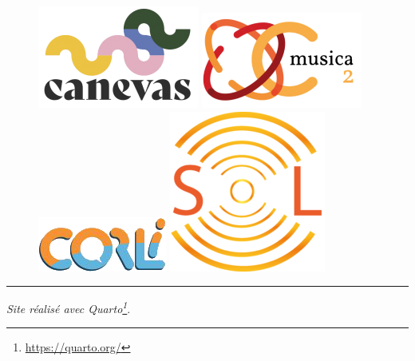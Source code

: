 \documentclass[
  letterpaper,
  DIV=11,
  numbers=noendperiod]{scrreport}
\DeclareRobustCommand{\href}[2]{#2\footnote{\url{#1}}}
\begin{document}
\begin{figure}
\newline
\begin{minipage}{0.33\linewidth}
\includegraphics{IMG/logo-canevas_png-200x127.png}\end{minipage}%
%
\begin{minipage}{0.33\linewidth}
\includegraphics{IMG/Musica-2-1-200x119.png}\end{minipage}%
%
\begin{minipage}{0.33\linewidth}
\includegraphics{IMG/logo-CORLI-png.png}\end{minipage}%
\newline
\begin{minipage}{0.33\linewidth}
\includegraphics{IMG/logo-sol-picto-194x200.png}\end{minipage}%

\end{figure}%

\begin{center}\rule{0.5\linewidth}{0.5pt}\end{center}

\emph{Site réalisé avec \href{https://quarto.org/}{Quarto}}.
\end{document}
